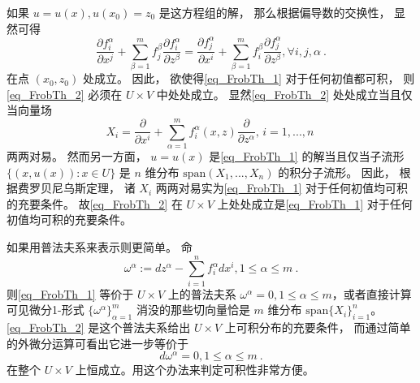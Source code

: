 如果 $u=u(x),u(x_0)=z_0$ 是这方程组的解， 那么根据偏导数的交换性， 显然可得
\begin{equation}\label{eq_FrobTh_2}
\frac{\partial f_i^\alpha}{\partial x^j}+\sum_{\beta=1}^mf_j^\beta\frac{\partial f_i^\alpha}{\partial z^\beta}
=\frac{\partial f_j^\alpha}{\partial x^i}+\sum_{\beta=1}^mf_i^\beta\frac{\partial f_j^\alpha}{\partial z^\beta},\forall i,j,\alpha~.
\end{equation}
在点 $(x_0,z_0)$ 处成立。 因此， 欲使得\autoref{eq_FrobTh_1} 对于任何初值都可积， 则\autoref{eq_FrobTh_2} 必须在 $U\times V$ 中处处成立。 显然\autoref{eq_FrobTh_2} 处处成立当且仅当向量场
$$
X_i=\frac{\partial}{\partial x^i}+\sum_{\alpha=1}^mf_i^\alpha(x,z)\frac{\partial}{\partial z^\alpha},\,i=1,...,n~
$$
两两对易。 然而另一方面， $u=u(x)$ 是\autoref{eq_FrobTh_1} 的解当且仅当子流形 $\{(x,u(x)):x\in U\}$ 是 $n$ 维分布 $\text{span}(X_1,...,X_n)$ 的积分子流形。 因此， 根据费罗贝尼乌斯定理， 诸 $X_i$ 两两对易实为\autoref{eq_FrobTh_1} 对于任何初值均可积的充要条件。 故\autoref{eq_FrobTh_2} 在 $U\times V$ 上处处成立是\autoref{eq_FrobTh_1} 对于任何初值均可积的充要条件。

如果用普法夫系来表示则更简单。 命
\begin{equation}\label{eq_FrobTh_3}
\omega^\alpha:=dz^\alpha-\sum_{i=1}^nf_i^\alpha dx^i,1\leq\alpha\leq m~.
\end{equation}
则\autoref{eq_FrobTh_1} 等价于 $U\times V$ 上的普法夫系 $\omega^\alpha=0,1\leq\alpha\leq m$，或者直接计算可见微分1-形式 $\{\omega^\alpha\}_{\alpha=1}^m$ 消没的那些切向量恰是 $m$ 维分布 $\text{span}\{X_i\}_{i=1}^n$。 \autoref{eq_FrobTh_2} 是这个普法夫系给出 $U\times V$ 上可积分布的充要条件， 而通过简单的外微分运算可看出它进一步等价于
$$
d\omega^\alpha=0,1\leq\alpha\leq m~.
$$
在整个 $U\times V$ 上恒成立。用这个办法来判定可积性非常方便。